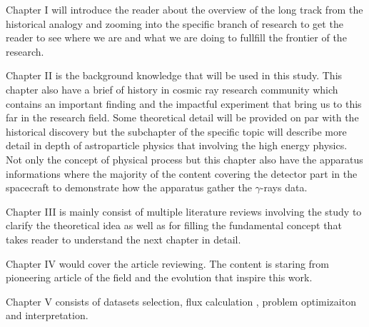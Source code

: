 Chapter I will introduce the reader about the overview of the long 
track from the historical analogy and zooming into the specific 
branch of research to get the reader to see where we are and what 
we are doing to fullfill the frontier of the research.

Chapter II is the background knowledge that will be used in this 
study. This chapter also have a brief of history in cosmic ray 
research community which contains an important finding and the 
impactful experiment that bring us to this far in the research field.
Some theoretical detail will be provided on par with the historical
discovery but the subchapter of the specific topic will describe more
detail in depth of astroparticle physics that involving the high 
energy physics. Not only the concept of physical process but this 
chapter also have the apparatus informations where the majority of the
content covering the detector part in the spacecraft to demonstrate
how the apparatus gather the $\gamma$-rays data.

Chapter III is mainly consist of multiple literature reviews involving
the study to clarify the theoretical idea as well as for filling the
fundamental concept that takes reader to understand the next chapter 
in detail. 


Chapter IV would cover the article reviewing.
The content is staring from pioneering article of the 
field and the evolution that inspire this work.

Chapter V consists of datasets selection, flux calculation
, problem optimizaiton and interpretation.


